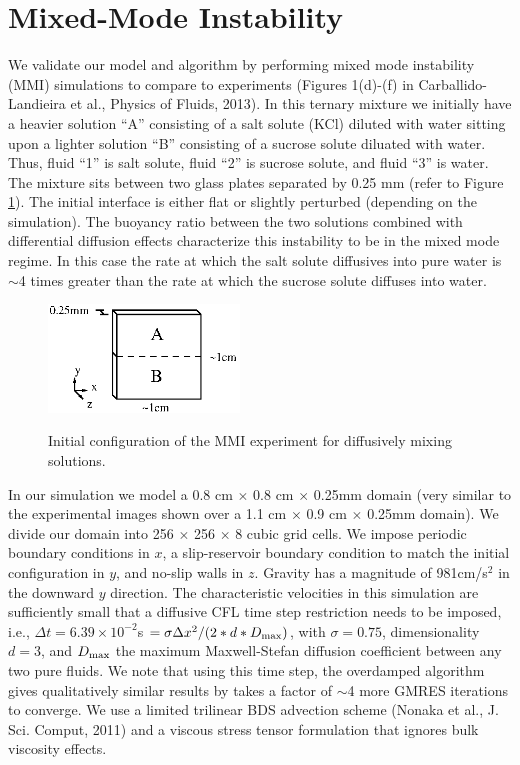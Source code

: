 \documentclass[final]{siamltex}
\begin{document}
\clearpage

\section{Mixed-Mode Instability}
We validate our model and algorithm by performing mixed mode instability (MMI) simulations to compare to experiments 
(Figures 1(d)-(f) in Carballido-Landieira et al., Physics of Fluids, 2013).  In this ternary mixture
we initially have a heavier solution ``A'' consisting of a salt solute (KCl) diluted with water sitting upon
a lighter solution ``B'' consisting of a sucrose solute diluated with water.  
Thus, fluid ``1'' is salt solute, fluid ``2'' is sucrose solute, and fluid ``3'' is water.
The mixture sits between two glass plates separated by 0.25 mm (refer to Figure \ref{fig:mmi}).
The initial interface is either flat or slightly perturbed (depending
on the simulation).  The buoyancy ratio between the two solutions combined with 
differential diffusion effects characterize this instability to be in the mixed mode
regime.  In this case the rate at which the salt solute diffusives into pure water is $\sim$4 times greater 
than the rate at which the sucrose solute diffuses into water.
\begin{figure}[hb]
\centering
\includegraphics[width=2in]{mmi}
\label{fig:mmi}
\caption{Initial configuration of the MMI experiment for diffusively mixing solutions.}
\end{figure}

In our simulation we model a 0.8 cm $\times$ 0.8 cm $\times$ 0.25mm domain (very similar to the experimental
images shown over a 1.1 cm $\times$ 0.9 cm $\times$ 0.25mm domain).  We divide our domain into 
256 $\times$ 256 $\times$ 8 cubic grid cells.  We impose periodic boundary conditions in $x$,
a slip-reservoir boundary condition to match the initial configuration in $y$, and no-slip walls in $z$.
Gravity has a magnitude of 981cm/s$^2$ in the downward $y$ direction.  The characteristic velocities in
this simulation are sufficiently small that a diffusive CFL time step restriction needs to be imposed, i.e.,
$\Delta t = 6.39 \times 10^{-2}$s $= \sigma\Delta x^2/(2*d*D_{\rm max})$, with $\sigma=0.75$, 
dimensionality $d=3$, and $D_{\rm max}$ the maximum Maxwell-Stefan diffusion coefficient between any two pure
fluids.  We note that using this time step, the overdamped algorithm gives qualitatively
similar results by takes a factor of $\sim$4 more GMRES iterations to converge.  We use a limited trilinear
BDS advection scheme (Nonaka et al., J. Sci. Comput, 2011) and a viscous stress tensor formulation that 
ignores bulk viscosity effects.
\end{document}

